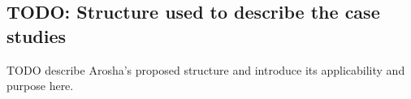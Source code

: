 \subsection{TODO: Structure used to describe the case studies}
TODO describe Arosha's proposed structure and introduce its applicability and purpose here.

\clearpage





\clearpage


\clearpage


\clearpage


\clearpage


\clearpage



\clearpage



\clearpage


\clearpage